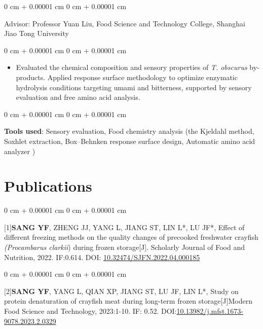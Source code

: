 \documentclass[10pt, letterpaper]{article}
\newenvironment{highlights}{
    \begin{itemize}[
        topsep=0.10 cm,
        parsep=0.10 cm,
        partopsep=0pt,
        itemsep=0pt,
        leftmargin=0 cm + 10pt
    ]
}{
    \end{itemize}
} %
\newenvironment{onecolentry}{
    \begin{adjustwidth}{
        0 cm + 0.00001 cm
    }{
        0 cm + 0.00001 cm
    }
}{
    \end{adjustwidth}
} %
\newenvironment{header}{
    \setlength{\topsep}{0pt}\par\kern\topsep\centering\linespread{1}
}{
    \par\kern\topsep
} %
\begin{document}
\begin{header}
        \vspace{0.10 cm}
        \begin{onecolentry}
            Advisor: Professor Yuan Liu, Food Science and Technology College, Shanghai Jiao Tong University
        \end{onecolentry}
        \begin{onecolentry}
            \begin{highlights}
              \item Evaluated the chemical composition and sensory properties of \textit{T. obscurus} by-products. Applied response surface methodology to optimize enzymatic hydrolysis conditions targeting umami and bitterness, supported by sensory evaluation and free amino acid analysis.
            \end{highlights}
        \end{onecolentry}
        \begin{onecolentry}
            \textbf{Tools used}: Sensory evaluation, Food chemistry analysis (the Kjeldahl method, Soxhlet extraction, Box–Behnken response surface design, Automatic amino acid analyzer )
        \end{onecolentry}


        \vspace{0 cm}

  \section{Publications}



        
       
            \begin{onecolentry}
                [1]\textbf{SANG YF}, ZHENG JJ, YANG L, JIANG ST, LIN L*, LU JF*, Effect of different freezing methods on the quality changes of precooked freshwater crayfish \textit{(Procambarus clarkii}) during frozen storage[J]. Scholarly Journal of Food and Nutrition, 2022. IF:0.614. DOI: \href{https://lupinepublishers.com/food-and-nutri-journal/special-issue/SJFN.MS.ID.000185.pdf}{10.32474/SJFN.2022.04.000185}
            \end{onecolentry}

            \vspace{0.10 cm}
        
        
       
        
    \begin{onecolentry}       
[2]\textbf{SANG YF}, YANG L, QIAN XP, JIANG ST, LU JF, LIN L*, Study on protein denaturation of crayfish meat during long-term frozen storage[J]Modern Food Science and Technology, 2023:1-10. IF: 0.52. DOI:\href{https://www.cnki.net/KCMS/detail/detail.aspx?dbcode=CJFD&dbname=CJFDLAST2023&filename=GZSP202302028&uniplatform=OVERSEA&v=soOOZP5IWiK8zEoJiUSH25hrWkfwL_jG5fhK2S2Gdr39PaWyCe0h2EooTi6tn2Wn}{10.13982/j.mfst.1673-9078.2023.2.0329}


\end{onecolentry}
\end{header}
\end{document}

